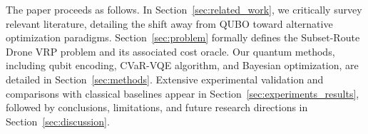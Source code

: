 The paper proceeds as follows. In Section~\ref{sec:related_work}, we critically survey 
relevant literature, detailing the shift away from QUBO toward alternative optimization 
paradigms. Section~\ref{sec:problem} formally defines the Subset-Route Drone VRP problem 
and its associated cost oracle. Our quantum methods, including qubit encoding, CVaR-VQE 
algorithm, and Bayesian optimization, are detailed in Section~\ref{sec:methods}. Extensive 
experimental validation and comparisons with classical baselines appear in 
Section~\ref{sec:experiments_results}, followed by conclusions, limitations, and future 
research directions in Section~\ref{sec:discussion}.
